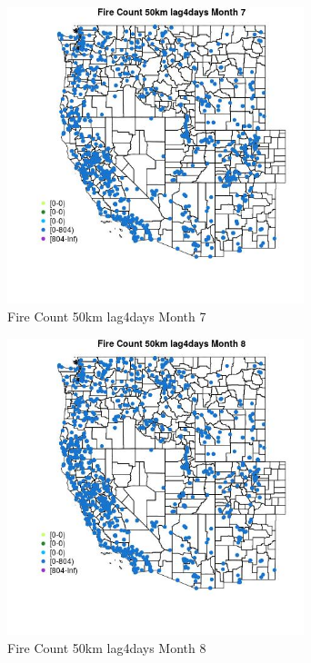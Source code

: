 \begin{figure} 
\centering  
\includegraphics[width=0.77\textwidth]{Code_Outputs/Report_ML_input_PM25_Step4_part_f_de_duplicated_aves_prioritize_24hr_obswNAs_MapObsMo7Fire_Count_50km_lag4days.jpg} 
\caption{\label{fig:Report_ML_input_PM25_Step4_part_f_de_duplicated_aves_prioritize_24hr_obswNAsMapObsMo7Fire_Count_50km_lag4days}Fire Count 50km lag4days Month 7} 
\end{figure} 
 

\begin{figure} 
\centering  
\includegraphics[width=0.77\textwidth]{Code_Outputs/Report_ML_input_PM25_Step4_part_f_de_duplicated_aves_prioritize_24hr_obswNAs_MapObsMo8Fire_Count_50km_lag4days.jpg} 
\caption{\label{fig:Report_ML_input_PM25_Step4_part_f_de_duplicated_aves_prioritize_24hr_obswNAsMapObsMo8Fire_Count_50km_lag4days}Fire Count 50km lag4days Month 8} 
\end{figure} 
 

